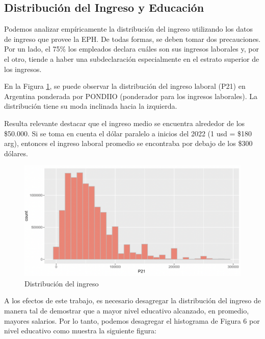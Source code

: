 \documentclass[a4paper]{article}
\theoremstyle{plain}
\theoremstyle{definition}
\begin{document}
\subsection{Distribución del Ingreso y Educación}
\label{sec:metodologia:sec4}

Podemos analizar empíricamente la distribución del ingreso utilizando los datos de ingreso que provee la EPH. De todas formas, se deben tomar dos precauciones. Por un lado, el 75\% los empleados declara cuáles son sus ingresos laborales y, por el otro, tiende a haber una subdeclaración especialmente en el estrato superior de los ingresos. 

En la Figura \ref{fig:distribucion_del_ingreso}, se puede observar la distribución del ingreso laboral (P21) en Argentina ponderada por PONDIIO (ponderador para los ingresos laborales). La distribución tiene su moda inclinada hacia la izquierda. 

Resulta relevante destacar que el ingreso medio se encuentra alrededor de los \$50.000. Si se toma en cuenta el dólar paralelo a inicios del 2022 (1 usd = \$180 arg), entonces el ingreso laboral promedio se encontraba por debajo de los \$300 dólares. 

\begin{figure}[h]
    \centering
    \includegraphics[scale=0.4]{figuras/Histograma.png}
    \caption{Distribución del ingreso}
    \label{fig:distribucion_del_ingreso}
\end{figure}

A los efectos de este trabajo, es necesario desagregar la distribución del ingreso de manera tal de demostrar que a mayor nivel educativo alcanzado, en promedio, mayores salarios. Por lo tanto, podemos desagregar el histograma de Figura 6 por nivel educativo como muestra la siguiente figura: 
\end{document}

